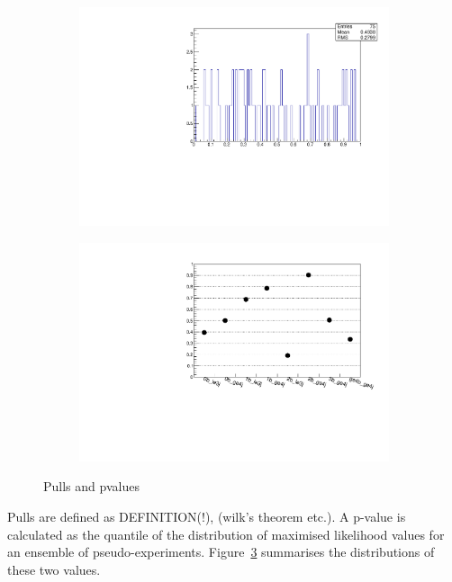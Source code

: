 \begin{figure}[h!]
\begin{subfigure}[b]{0.46\textwidth}
    \includegraphics[width=\textwidth]{Figs/results/v0/pulls/pvalue_per_bin.pdf}
    \caption{}
    \label{fig:pvalue_distro}
  \end{subfigure}
  \begin{subfigure}[b]{0.46\textwidth}
    \includegraphics[width=\textwidth]{Figs/results/v0/pulls/pvalue_vs_cat.pdf}
    \caption{}
    \label{fig:pvalue_per_cat}
  \end{subfigure}
  \caption{Pulls and pvalues}
  \label{fig:pull_analysis}
\end{figure}

Pulls are defined as DEFINITION(!), (wilk's theorem etc.). A p-value is
calculated as the
quantile of the distribution of maximised likelihood values for an ensemble of
pseudo-experiments. Figure~\ref{fig:pull_analysis} summarises the distributions
of these two values.

